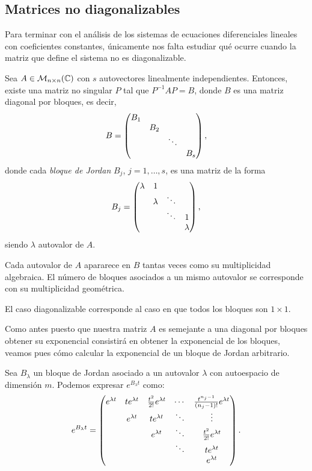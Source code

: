 \documentclass[../ecuaciones_diferenciales.tex]{subfiles}
\begin{document}
\subsection{Matrices no diagonalizables}

Para terminar con el análisis de los sistemas de ecuaciones diferenciales
lineales con coeficientes constantes, únicamente nos falta estudiar qué ocurre
cuando la matriz que define el sistema no es diagonalizable.

\begin{theorem}
	Sea \(A \in \mathcal{M}_{n \times n}(\mathbb{C})\) con \(s\) autovectores
	linealmente independientes. Entonces, existe una matriz no singular \(P\)
	tal que \(P^{-1} A P = B\), donde \(B\) es una matriz diagonal por bloques,
	es decir,
	\[B = \begin{pmatrix}B_1 & & & \\ & B_2 & & \\ & & \ddots & \\ & & & B_s\end{pmatrix},\]
	donde cada \emph{bloque de Jordan} \(B_j\), \(j = 1, \dots, s\), 
	es una matriz de la forma
	\[B_j = \begin{pmatrix}\lambda & 1 & & \\ 
		& \lambda & \ddots & \\ 
		& & \ddots & 1 \\ 
		& & & \lambda\end{pmatrix},\]
	siendo \(\lambda\) autovalor de \(A\).
\end{theorem}

Cada autovalor de \(A\) apararece en \(B\) tantas veces como su multiplicidad 
algebraica. El número de bloques asociados a un mismo autovalor se corresponde 
con su multiplicidad geométrica.

\begin{remark}
	El caso diagonalizable corresponde al caso en que todos los bloques son \(1
	\times 1\).
\end{remark}

Como antes puesto que nuestra matriz \(A\) es semejante a una diagonal por
bloques obtener su exponencial consistirá en obtener la exponencial de los
bloques, veamos pues cómo calcular la exponencial de un bloque de Jordan 
arbitrario.

\begin{proposition}
	Sea \(B_\lambda\) un bloque de Jordan asociado a un autovalor \(\lambda\)
	con autoespacio de dimensión \(m\).
	Podemos expresar \(e^{B_\lambda t}\) como:
	\[e^{B_\lambda t} = 
	\begin{pmatrix}e^{\lambda t} & te^{\lambda t} & \frac{t^2}{2!}e^{\lambda t} & \cdots & \frac{t^{n_j-1}}{(n_j-1)!}e^{\lambda t} \\
	& e^{\lambda t} & te^{\lambda t}              & \ddots & \vdots                    \\
	&   & e^{\lambda t}              & \ddots & \frac{t^2}{2!}e^{\lambda t}            \\
	&   &                & \ddots & te^{\lambda t}                         \\
	&   &                &        & e^{\lambda t}\end{pmatrix}.\]
\end{proposition}
\end{document}
